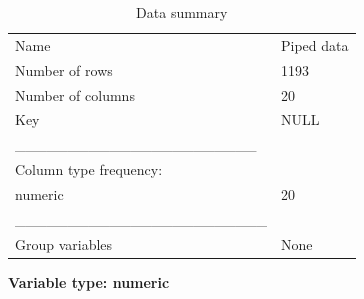 \documentclass[
  letterpaper,
  DIV=11,
  numbers=noendperiod]{scrreprt}
\begin{document}
\begin{longtable}[]{@{}ll@{}}
\caption{Data summary}\tabularnewline
\toprule()
\endhead
Name & Piped data \\
Number of rows & 1193 \\
Number of columns & 20 \\
Key & NULL \\
\_\_\_\_\_\_\_\_\_\_\_\_\_\_\_\_\_\_\_\_\_\_\_ & \\
Column type frequency: & \\
numeric & 20 \\
\_\_\_\_\_\_\_\_\_\_\_\_\_\_\_\_\_\_\_\_\_\_\_\_ & \\
Group variables & None \\
\bottomrule()
\end{longtable}

\textbf{Variable type: numeric}
\end{document}
